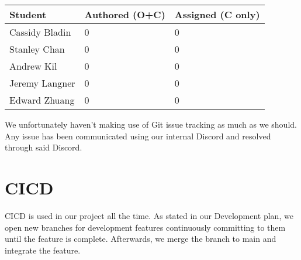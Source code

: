 \documentclass{article}
\begin{document}
\begin{table}[H]
\centering
\begin{tabular}{lll}
\toprule
\textbf{Student} & \textbf{Authored (O+C)} & \textbf{Assigned (C only)}\\
\midrule
Cassidy Bladin & 0 & 0 \\
Stanley Chan & 0 & 0 \\
Andrew Kil & 0 & 0 \\
Jeremy Langner & 0 & 0 \\
Edward Zhuang & 0 & 0 \\
\bottomrule
\end{tabular}
\end{table}

We unfortunately haven't making use of Git issue tracking as much as we should. Any issue has been communicated using our internal Discord and resolved through said Discord.

\section{CICD}

CICD is used in our project all the time. As stated in our Development plan, we open new branches for development features continuously committing to them until the feature is complete. Afterwards, we merge the branch to main and integrate the feature. 
\end{document}

